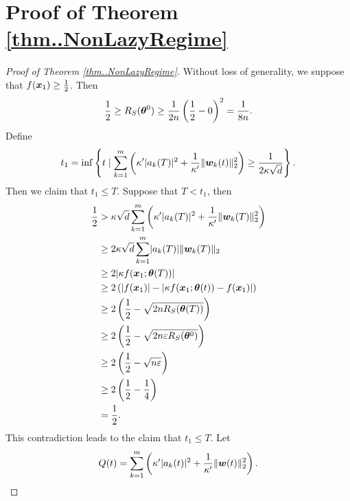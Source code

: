 \documentclass{article}
\begin{document}
\section{Proof of Theorem \ref{thm..NonLazyRegime}}
\begin{proof}[Proof of Theorem \ref{thm..NonLazyRegime}]
    Without loss of generality, we suppose that $f(\bm{x}_1)\geq\frac{1}{2}$. Then
    \begin{equation*}
        \frac{1}{2}\geq R_S(\bm{\theta}^0)\geq\frac{1}{2n}\left(\frac{1}{2}-0\right)^2=\frac{1}{8n}.
    \end{equation*}
    Define
    \begin{equation}
        t_1=\inf\left\{t\mid \sum_{k=1}^m\left(\kappa'\lvert a_k(T)\rvert^2+\frac{1}{\kappa'}\lVert\bm{w}_k(t)\rVert^2_2\right)\geq\frac{1}{2\kappa\sqrt{d}}\right\}.
    \end{equation}
    Then we claim that $t_1\leq T$. Suppose that $T<t_1$, then
    \begin{equation*}
        \begin{aligned}
            \frac{1}{2}
             & > \kappa \sqrt{d}\sum_{k=1}^m\left(\kappa'\lvert a_k(T)\rvert^2+\frac{1}{\kappa'}\lVert\bm{w}_k(T)\rVert_2^2\right) \\
             & \geq 2\kappa\sqrt{d}\sum_{k=1}^m \lvert a_k(T)\rvert\lVert\bm{w}_k(T)\rVert_2                                  \\
             & \geq 2\lvert\kappa f(\bm{x}_1;\bm{\theta}(T))\rvert                                                           \\
             & \geq 2\left(\lvert f(\bm{x}_1)\rvert-\lvert\kappa f(\bm{x}_1;\bm{\theta}(t))-f(\bm{x}_1)\rvert\right)                      \\
             & \geq 2\left(\frac{1}{2}-\sqrt{2nR_S(\bm{\theta}(T))}\right)                                   \\
             & \geq2\left(\frac{1}{2}-\sqrt{2n\varepsilon R_S(\bm{\theta}^0)}\right)                                 \\
             & \geq 2\left(\frac{1}{2}-\sqrt{n\varepsilon}\right)                                               \\
             & \geq 2\left(\frac{1}{2}-\frac{1}{4}\right)                                                \\
             & = \frac{1}{2}.
        \end{aligned}
    \end{equation*}
    This contradiction leads to the claim that $t_1\leq T$. Let
    \begin{equation}
        Q(t)=\sum_{k=1}^m\left(\kappa'\abs{a_k(t)}^2+\frac{1}{\kappa'}\norm{\vw(t)}_2^2\right).

\end{equation}
\end{proof}
\end{document}
